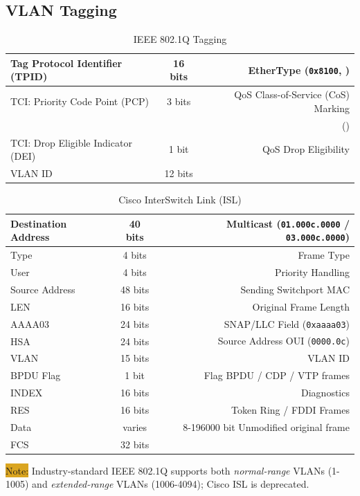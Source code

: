 \documentclass[12pt]{article}
\newcommand{\note}[1]{\colorbox{#1}{Note:}}
\begin{document}
	\subsection{VLAN Tagging \label{subsec:VLAN TAGGING}}
	\begin{table}[H]
	\centering
	\caption{IEEE 802.1Q Tagging \label{tab:802.1Q}}
	\begin{tabular}{| l | c | r |}
	\hline
	Tag Protocol Identifier (TPID)		& 16 bits	& EtherType (\texttt{0x8100}, \Cref{tab:ETHERTYPE})\\\hline
	TCI: Priority Code Point (PCP)		& 3 bits	& QoS Class-of-Service (CoS) Marking\\
							&		& (\Cref{sec:QOS})\\\hline
	TCI: Drop Eligible Indicator (DEI)	& 1 bit 	& QoS Drop Eligibility\\\hline
	VLAN ID 					& 12 bits	&\\\hline
	\end{tabular}\end{table}

	\begin{table}[H]
	\centering
	\caption{Cisco InterSwitch Link (ISL) \label{tab:CISCO ISL}}
	\begin{tabular}{| l | c | r |}
	\hline
	Destination Address	& 40 bits	& Multicast (\texttt{01.000c.0000} / \texttt{03.000c.0000})\\\hline
	Type				& 4 bits	& Frame Type\\\hline
	User				& 4 bits	& Priority Handling\\\hline
	Source Address		& 48 bits	& Sending Switchport MAC\\\hline
	LEN				& 16 bits	& Original Frame Length\\\hline
	AAAA03			& 24 bits	& SNAP/LLC Field (\texttt{0xaaaa03})\\\hline
	HSA				& 24 bits	& Source Address OUI (\texttt{0000.0c})\\\hline
	VLAN				& 15 bits	& VLAN ID\\\hline
	BPDU Flag			& 1 bit 	& Flag BPDU / CDP / VTP frames\\\hline
	INDEX			& 16 bits	& Diagnostics\\\hline
	RES				& 16 bits	& Token Ring / FDDI Frames\\\hline
	Data				& varies	& 8-196000 bit Unmodified original frame\\\hline
	FCS				& 32 bits	&\\\hline
	\end{tabular}\end{table}
	\note{Goldenrod} Industry-standard IEEE 802.1Q supports both \textit{normal-range} VLANs (1-1005) and \textit{extended-range} VLANs (1006-4094); Cisco ISL is deprecated.
\end{document}
